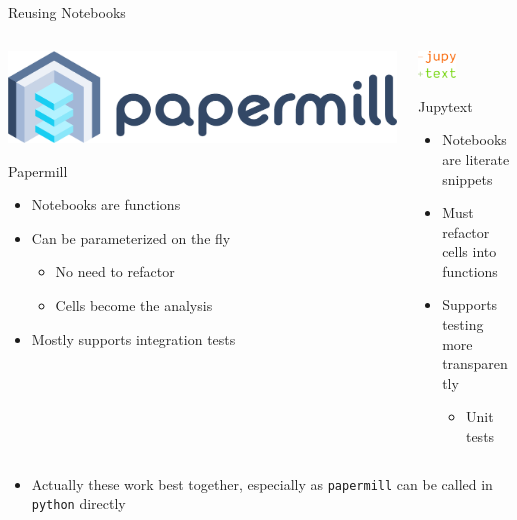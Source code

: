 \documentclass[bigger,unknownkeysallowed,aspectratio=169,red,colorblocks]{beamer}
\begin{document}
\begin{frame}[label={sec:orgfbd1e57},fragile]{Reusing Notebooks}
 \begin{columns}
\begin{column}{0.5\columnwidth}
\begin{center}
\includegraphics[width=.9\linewidth]{images/logos/papermill_logo_wide.png}
\end{center}
\begin{block}{Papermill}
\begin{itemize}
\item Notebooks are \alert{functions}
\item Can be parameterized on the fly
\begin{itemize}
\item No need to refactor
\item Cells \alert{become} the analysis
\end{itemize}
\item Mostly supports integration tests
\end{itemize}
\end{block}
\end{column}

\begin{column}{0.4\columnwidth}
\begin{center}
\includegraphics[width=0.4\textwidth]{images/A_screenshot/2020-09-20_07-16-32_screenshot.png}
\end{center}

\begin{block}{Jupytext}
\begin{itemize}
\item Notebooks are literate snippets
\item Must refactor cells into functions
\item Supports testing more transparently
\begin{itemize}
\item Unit tests
\end{itemize}
\end{itemize}
\end{block}
\end{column}
\end{columns}
\begin{itemize}
\item Actually these work best together, especially as \texttt{papermill} can be called in \texttt{python} directly
\end{itemize}
\end{frame}
\end{document}
